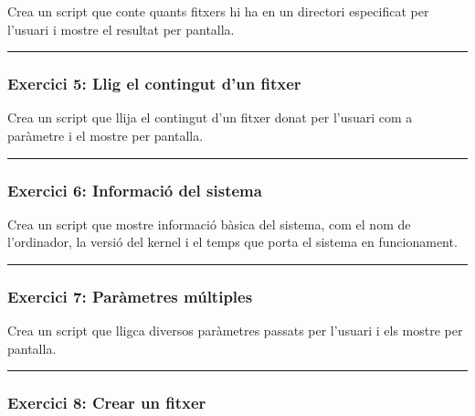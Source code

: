 \documentclass[
  12 pt,
  a4paper,
]{article}
\begin{document}
Crea un script que conte quants fitxers hi ha en un directori
especificat per l'usuari i mostre el resultat per pantalla.

\begin{center}\rule{0.5\linewidth}{0.5pt}\end{center}

\subsubsection{\texorpdfstring{\textbf{Exercici 5: Llig el contingut
d'un
fitxer}}{Exercici 5: Llig el contingut d'un fitxer}}\label{exercici-5-llig-el-contingut-dun-fitxer}

Crea un script que llija el contingut d'un fitxer donat per l'usuari com
a paràmetre i el mostre per pantalla.

\begin{center}\rule{0.5\linewidth}{0.5pt}\end{center}

\subsubsection{\texorpdfstring{\textbf{Exercici 6: Informació del
sistema}}{Exercici 6: Informació del sistema}}\label{exercici-6-informaciuxf3-del-sistema}

Crea un script que mostre informació bàsica del sistema, com el nom de
l'ordinador, la versió del kernel i el temps que porta el sistema en
funcionament.

\begin{center}\rule{0.5\linewidth}{0.5pt}\end{center}

\subsubsection{\texorpdfstring{\textbf{Exercici 7: Paràmetres
múltiples}}{Exercici 7: Paràmetres múltiples}}\label{exercici-7-paruxe0metres-muxfaltiples}

Crea un script que lligca diversos paràmetres passats per l'usuari i els
mostre per pantalla.

\begin{center}\rule{0.5\linewidth}{0.5pt}\end{center}

\subsubsection{\texorpdfstring{\textbf{Exercici 8: Crear un
fitxer}}{Exercici 8: Crear un fitxer}}\label{exercici-8-crear-un-fitxer}
\end{document}
